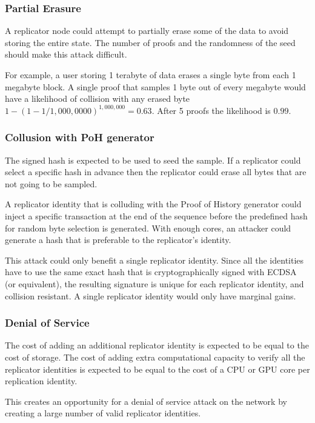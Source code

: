 \documentclass[12pt]{ltjsarticle}
\begin{document}
\subsubsection{Partial Erasure}

A replicator node could attempt to partially erase some of the data to avoid storing the entire state. The number of proofs and the randomness of the seed should make this attack difficult.

For example, a user storing 1 terabyte of data erases a single byte from each 1 megabyte block. A single proof that samples 1 byte out of every megabyte would have a likelihood of collision with any erased byte \(1 - (1- 1/1,000,0000)^{1,000,000} = 0.63\). After 5 proofs the likelihood is \(0.99\).

\subsubsection{Collusion with PoH generator}

The signed hash is expected to be used to seed the sample. If a replicator could select a specific hash in advance then the replicator could erase all bytes that are not going to be sampled.

A replicator identity that is colluding with the Proof of History generator could inject a specific transaction at the end of the sequence before the predefined hash for random byte selection is generated. With enough cores, an attacker could generate a hash that is preferable to the replicator’s identity.

This attack could only benefit a single replicator identity. Since all the identities have to use the same exact hash that is cryptographically signed with ECDSA (or equivalent), the resulting signature is unique for each replicator identity, and collision resistant. A single replicator identity would only have marginal gains.
\subsubsection{Denial of Service}
The cost of adding an additional replicator identity is expected to be equal to the cost of storage. The cost of adding extra computational capacity to verify all the replicator identities is expected to be equal to the cost of a CPU or GPU core per replication identity.

This creates an opportunity for a denial of service attack on the network by creating a large number of valid replicator identities.
\end{document}
